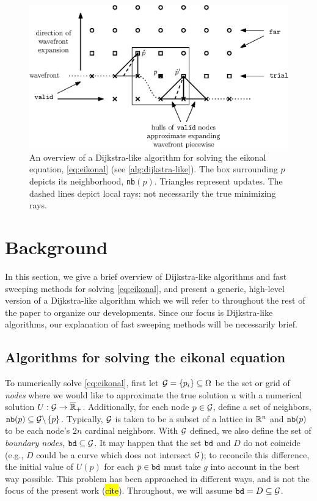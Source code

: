 \documentclass[eikonal.tex]{subfiles}
\begin{document}
\begin{figure}[t]
  \centering
  \includegraphics{overview.eps}
  \caption{An overview of a Dijkstra-like algorithm for solving the
    eikonal equation, \cref{eq:eikonal} (see
    \cref{alg:dijkstra-like}). The box surrounding $p$ depicts its
    neighborhood, \texttt{nb}$(p)$. Triangles represent updates. The
    dashed lines depict local rays: not necessarily the true
    minimizing rays.}
  \label{fig:overview}
\end{figure}

\section{Background}\label{sec:background}

In this section, we give a brief overview of Dijkstra-like algorithms
and fast sweeping methods for solving \cref{eq:eikonal}, and present a
generic, high-level version of a Dijkstra-like algorithm which we will
refer to throughout the rest of the paper to organize our
developments. Since our focus is Dijkstra-like algorithms, our
explanation of fast sweeping methods will be necessarily brief.

\subsection{Algorithms for solving the eikonal equation}

To numerically solve \cref{eq:eikonal}, first let
$\mathcal{G} = \{p_i\} \subseteq \Omega$ be the set or grid of \emph{nodes}
where we would like to approximate the true solution $u$ with a
numerical solution $U : \mathcal{G} \to
\overline{\mathbb{R}}_+$. Additionally, for each node $p \in \mathcal{G}$,
define a set of neighbors,
$\texttt{nb}(p) \subseteq \mathcal{G} \backslash \left\{p\right\}$. Typically, $\mathcal{G}$ is
taken to be a subset of a lattice in $\mathbb{R}^n$ and $\texttt{nb}(p)$ to be each
node's $2n$ cardinal neighbors. With $\mathcal{G}$ defined, we also define
the set of \emph{boundary nodes}, $\texttt{bd} \subseteq \mathcal{G}$. It may
happen that the set $\texttt{bd}$ and $D$ do not coincide (e.g., $D$
could be a curve which does not intersect $\mathcal{G}$); to reconcile this
difference, the initial value of $U(p)$ for each $p \in \texttt{bd}$
must take $g$ into account in the best way possible. This problem has
been approached in different ways, and is not the focus of the present
work (\hl{cite}). Throughout, we will assume
$\texttt{bd} = D \subseteq \mathcal{G}$.
\end{document}
